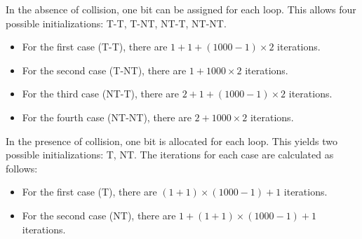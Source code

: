 In the absence of collision, one bit can be assigned for each loop. This allows four possible initializations: T-T, T-NT, NT-T, NT-NT.\@
\begin{itemize}
    \item For the first case (T-T), there are $1 + 1 + (1000-1) \times 2$ iterations.
    \item For the second case (T-NT), there are $1 + 1000 \times 2$ iterations.
    \item For the third case (NT-T), there are $2 + 1 + (1000-1) \times 2$ iterations.
    \item For the fourth case (NT-NT), there are $2 + 1000 \times 2$ iterations.
\end{itemize}
In the presence of collision, one bit is allocated for each loop. 
This yields two possible initializations: T, NT.\@
The iterations for each case are calculated as follows:
\begin{itemize}
    \item For the first case (T), there are $(1+1) \times (1000-1) + 1$ iterations.
    \item For the second case (NT), there are $1 + (1+1) \times (1000-1) + 1$ iterations.
\end{itemize}

